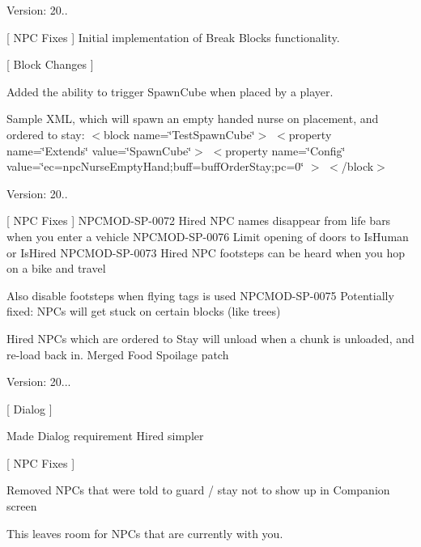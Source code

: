 Version\+: 20..

\mbox{[} NPC Fixes \mbox{]} Initial implementation of Break Blocks functionality.

\mbox{[} Block Changes \mbox{]}
\begin{DoxyItemize}
\item Added the ability to trigger Spawn\+Cube when placed by a player.
\end{DoxyItemize}

Sample XML, which will spawn an empty handed nurse on placement, and ordered to stay\+: $<$block name=\char`\"{}\+Test\+Spawn\+Cube\char`\"{}$>$ $<$property name=\char`\"{}\+Extends\char`\"{} value=\char`\"{}\+Spawn\+Cube\char`\"{}$>$ $<$property name=\char`\"{}\+Config\char`\"{} value=\char`\"{}ec=npc\+Nurse\+Empty\+Hand;buff=buff\+Order\+Stay;pc=0\char`\"{} $>$ $<$/block$>$

Version\+: 20..

\mbox{[} NPC Fixes \mbox{]} NPCMOD-\/\+SP-\/0072 Hired NPC names disappear from life bars when you enter a vehicle NPCMOD-\/\+SP-\/0076 Limit opening of doors to Is\+Human or Is\+Hired NPCMOD-\/\+SP-\/0073 Hired NPC footsteps can be heard when you hop on a bike and travel
\begin{DoxyItemize}
\item Also disable footsteps when flying tags is used NPCMOD-\/\+SP-\/0075 Potentially fixed\+: NPCs will get stuck on certain blocks (like trees)
\end{DoxyItemize}

Hired NPCs which are ordered to Stay will unload when a chunk is unloaded, and re-\/load back in. Merged Food Spoilage patch

Version\+: 20...

\mbox{[} Dialog \mbox{]}
\begin{DoxyItemize}
\item Made Dialog requirement Hired simpler
\end{DoxyItemize}

\mbox{[} NPC Fixes \mbox{]}
\begin{DoxyItemize}
\item Removed NPCs that were told to guard / stay not to show up in Companion screen
\begin{DoxyItemize}
\item This leaves room for NPCs that are currently with you.
\end{DoxyItemize}
\end{DoxyItemize}

